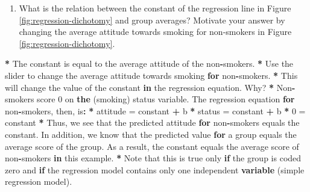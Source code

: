 \documentclass[a4paper]{book}
\newenvironment{Shaded}{\begin{snugshade}}{\end{snugshade}}
\newcommand{\KeywordTok}[1]{\textcolor[rgb]{0,0,0}{\textbf{#1}}}
\newcommand{\DecValTok}[1]{\textcolor[rgb]{0.00,0.00,0.00}{#1}}
\newcommand{\StringTok}[1]{\textcolor[rgb]{0.00,0.00,0.00}{#1}}
\newcommand{\ControlFlowTok}[1]{\textcolor[rgb]{0.00,0.00,0.00}{\textbf{#1}}}
\newcommand{\OperatorTok}[1]{\textcolor[rgb]{0.00,0.00,0.00}{\textbf{#1}}}
\newcommand{\ErrorTok}[1]{\textcolor[rgb]{0.00,0.00,0.00}{\textbf{#1}}}
\newcommand{\NormalTok}[1]{#1}
\providecommand{\tightlist}{%
  \setlength{\itemsep}{0pt}\setlength{\parskip}{0pt}}
\theoremstyle{definition}
\theoremstyle{definition}
\theoremstyle{definition}
\theoremstyle{remark}
\begin{document}
\begin{enumerate}
\def\labelenumi{\arabic{enumi}.}
\tightlist
\item
  What is the relation between the constant of the regression line in
  Figure \ref{fig:regression-dichotomy} and group averages? Motivate
  your answer by changing the average attitude towards smoking for
  non-smokers in Figure \ref{fig:regression-dichotomy}.
\end{enumerate}

\begin{Shaded}
\begin{Highlighting}[]
\OperatorTok{*}\StringTok{ }\NormalTok{The constant is equal to the average attitude of the non}\OperatorTok{-}\NormalTok{smokers.}
\OperatorTok{*}\StringTok{ }\NormalTok{Use the slider to change the average attitude towards smoking }\ControlFlowTok{for}
\NormalTok{non}\OperatorTok{-}\NormalTok{smokers.}
\OperatorTok{*}\StringTok{ }\NormalTok{This will change the value of the constant }\ControlFlowTok{in}\NormalTok{ the regression equation. Why?}
\OperatorTok{*}\StringTok{ }\NormalTok{Non}\OperatorTok{-}\NormalTok{smokers score }\DecValTok{0}\NormalTok{ on }\KeywordTok{the}\NormalTok{ (smoking) status variable. The regression}
\NormalTok{equation }\ControlFlowTok{for}\NormalTok{ non}\OperatorTok{-}\NormalTok{smokers, then, is}\OperatorTok{:}
\ErrorTok{*}\StringTok{ }\NormalTok{attitude =}\StringTok{ }\NormalTok{constant }\OperatorTok{+}\StringTok{ }\NormalTok{b }\OperatorTok{*}\StringTok{ }\NormalTok{status =}\StringTok{ }\NormalTok{constant }\OperatorTok{+}\StringTok{ }\NormalTok{b }\OperatorTok{*}\StringTok{ }\DecValTok{0}\NormalTok{ =}\StringTok{ }\NormalTok{constant}
\OperatorTok{*}\StringTok{ }\NormalTok{Thus, we see that the predicted attitude }\ControlFlowTok{for}\NormalTok{ non}\OperatorTok{-}\NormalTok{smokers equals the}
\NormalTok{constant. In addition, we know that the predicted value }\ControlFlowTok{for}\NormalTok{ a group}
\NormalTok{equals the average score of the group. As a result, the constant equals}
\NormalTok{the average score of non}\OperatorTok{-}\NormalTok{smokers }\ControlFlowTok{in}\NormalTok{ this example.}
\OperatorTok{*}\StringTok{ }\NormalTok{Note that this is true only }\ControlFlowTok{if}\NormalTok{ the group is coded zero and }\ControlFlowTok{if}\NormalTok{ the regression}
\NormalTok{model contains only one independent }\KeywordTok{variable}\NormalTok{ (simple regression model).}
\end{Highlighting}
\end{Shaded}
\end{document}
